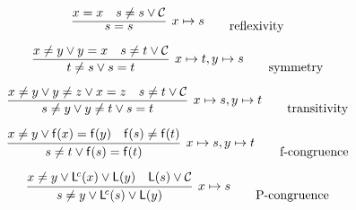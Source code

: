 \begin{gather*}
	\infer[x\mapsto s]
	{{ s=s} 
		}
	{x = x & s\neq s \lor \mcC } 
	\tag*{reflexivity}
	\\[0.5em]
	\infer[x\mapsto t, y\mapsto s]
	{t\neq s \lor s=t 
		}
	{x\neq y\lor y=x & s\neq t \lor \mcC}
	\tag*{symmetry}
	\\[0.5em]
	\infer[x\mapsto s, y\mapsto t]
	{s\neq y \lor y \neq t \lor s = t}
	{x\neq y \lor y\neq z \lor x = z & s \neq t \lor \mcC}
	\tag*{transitivity}
	\\[0.5em]
	\infer[x\mapsto s,y\mapsto t]
	{s \neq t \lor \mf(s) = \mf(t)}
	{x\neq y \lor \mf(x) = \mf(y) & \mf(s)\neq \mf(t)}
	\tag*{f-congruence}
	\\[0.5em]
	\infer[x \mapsto s]
	{s \neq y \lor \mL^{\!c}(s) \lor \mL(y)}
	{x \neq y \lor \mL^{\!c}(x) \lor \mL(y) & {\mL(s)} \lor \mcC}
	\tag*{P-congruence}
\end{gather*}